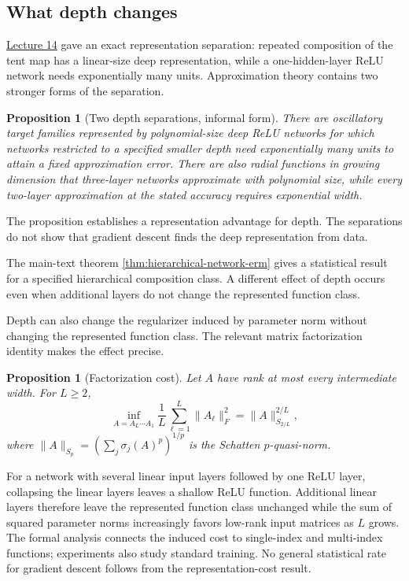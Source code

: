 \documentclass[11pt,twoside]{article}
\newtheorem{proposition}[theorem]{Proposition}
\theoremstyle{definition}
\theoremstyle{remark}
\begin{document}
\subsection{What depth changes}
\label{sec:depth}

\href{lecture14.pdf}{Lecture 14} gave an exact representation separation:
repeated composition of the tent map has a linear-size deep representation,
while a one-hidden-layer
ReLU network needs exponentially many units. Approximation theory contains two
stronger forms of the separation.
\begin{proposition}[Two depth separations, informal form]
There are oscillatory target families represented by polynomial-size deep
ReLU networks for which networks restricted to a specified smaller depth need
exponentially many units to attain a fixed approximation error. There are also
radial functions in growing dimension that three-layer networks approximate
with polynomial size, while every two-layer approximation at the stated
accuracy requires exponential width.
\end{proposition}
The proposition establishes a representation advantage for depth. The
separations do not show that gradient descent finds the deep representation
from data.

The main-text theorem \cref{thm:hierarchical-network-erm} gives a statistical
result for a specified hierarchical composition class. A different effect of
depth occurs even when additional layers do not change the represented
function class.

Depth can also change the regularizer induced by parameter norm without
changing the represented function class. The relevant matrix factorization
identity makes the effect precise.
\begin{proposition}[Factorization cost]
Let $A$ have rank at most every intermediate width. For $L\geq2$,
\begin{equation}
 \inf_{A=A_L\cdots A_1}
 \frac1L\sum_{\ell=1}^L\|A_\ell\|_F^2
 =\|A\|_{S_{2/L}}^{2/L},
 \label{eq:factorization-cost}
\end{equation}
where $\|A\|_{S_p}=(\sum_j\sigma_j(A)^p)^{1/p}$ is the Schatten
$p$-quasi-norm.
\end{proposition}
For a network with several linear input layers followed by one ReLU layer,
collapsing the linear layers leaves a shallow ReLU function. Additional linear
layers therefore leave the represented function class unchanged while the
sum of squared parameter norms increasingly favors low-rank input matrices as
$L$ grows. The formal analysis connects the induced cost to single-index and
multi-index functions; experiments also study standard training. No general
statistical rate for gradient descent follows from the representation-cost
result.
\end{document}

